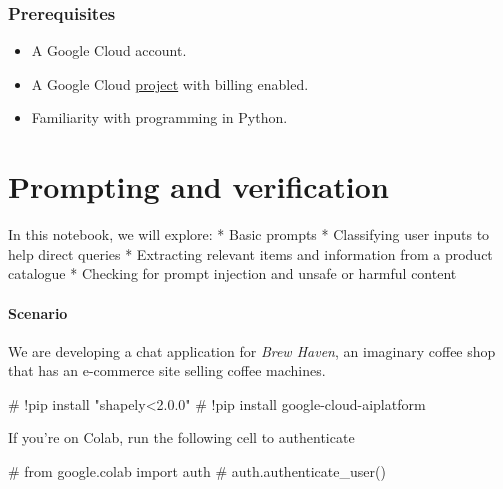 \documentclass[
  letterpaper,
  DIV=11,
  numbers=noendperiod]{scrreprt}
\newenvironment{Shaded}{\begin{snugshade}}{\end{snugshade}}
\newcommand{\CommentTok}[1]{\textcolor[rgb]{0.37,0.37,0.37}{#1}}
\providecommand{\tightlist}{%
  \setlength{\itemsep}{0pt}\setlength{\parskip}{0pt}}\usepackage{longtable,booktabs,array}
\begin{document}
\hypertarget{prerequisites}{%
\subsection*{Prerequisites}\label{prerequisites}}

\begin{itemize}
\tightlist
\item
  A Google Cloud account.
\item
  A Google Cloud
  \href{https://cloud.google.com/resource-manager/docs/creating-managing-projects}{project}
  with billing enabled.
\item
  Familiarity with programming in Python.
\end{itemize}


\hypertarget{prompting-and-verification}{%
\chapter{Prompting and verification}\label{prompting-and-verification}}

In this notebook, we will explore: * Basic prompts * Classifying user
inputs to help direct queries * Extracting relevant items and
information from a product catalogue * Checking for prompt injection and
unsafe or harmful content

\hypertarget{scenario}{%
\subsubsection{Scenario}\label{scenario}}

We are developing a chat application for \emph{Brew Haven}, an imaginary
coffee shop that has an e-commerce site selling coffee machines.

\begin{Shaded}
\begin{Highlighting}[]
\CommentTok{\# !pip install "shapely\textless{}2.0.0"}
\CommentTok{\# !pip install google{-}cloud{-}aiplatform}
\end{Highlighting}
\end{Shaded}

If you're on Colab, run the following cell to authenticate

\begin{Shaded}
\begin{Highlighting}[]
\CommentTok{\# from google.colab import auth}
\CommentTok{\# auth.authenticate\_user()}
\end{Highlighting}
\end{Shaded}
\end{document}
